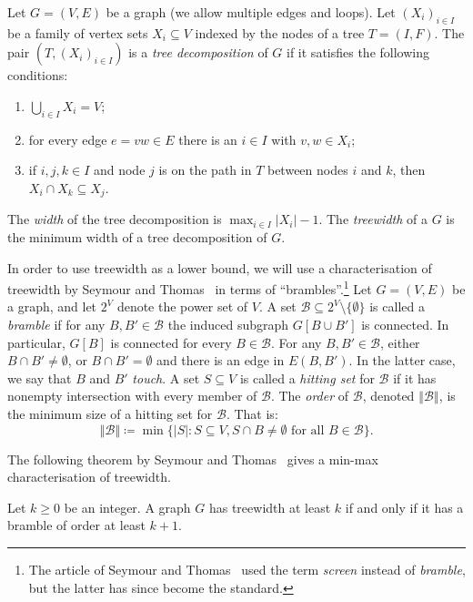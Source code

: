 \documentclass[ALCO,ThmDefs,Unicode,epreuves]{cedram}
\newcommand*{\B}{\mathcal{B}}
\newcommand*{\order}[1]{\left\Vert#1\right\Vert}
\begin{document}
Let $G=(V,E)$ be a graph (we allow multiple edges and loops). Let $(X_i)_{i\in I}$ be a family of vertex sets $X_i\subseteq V$ indexed by the nodes of a tree $T=(I,F)$. The pair $(T,(X_i)_{i\in I})$ is a \emph{tree decomposition} of $G$ if it satisfies the following conditions: 
\begin{enumerate}[label=(\roman*)]
 \item $\bigcup_{i\in I} X_i = V$;
 \item for every edge $e=vw\in E$ there is an $i\in I$ with $v,w\in X_i$;
 \item if $i,j,k\in I$ and node $j$ is on the path in $T$ between nodes $i$ and $k$, then $X_i\cap X_k\subseteq X_j$.
\end{enumerate}
The \emph{width} of the tree decomposition is $\max_{i\in I} |X_i|-1$. The \emph{treewidth} of a $G$ is the minimum width of a tree decomposition of $G$. 


In order to use treewidth as a lower bound, we will use a characterisation of treewidth by Seymour and Thomas~\cite{SeymourThomas1993} in terms of ``brambles''.\footnote{The article of Seymour and Thomas~\cite{SeymourThomas1993} used the term \emph{screen} instead of \emph{bramble}, but the latter has since become the standard.} Let $G=(V,E)$ be a graph, and let $2^V$ denote the power set of $V$. A set $\B\subseteq 2^V\setminus\{\emptyset\}$ is called a \emph{bramble} if for any $B,B'\in \B$ the induced subgraph $G[B\cup B']$ is connected. In particular, $G[B]$ is connected for every $B\in \B$. For any $B,B'\in \B$, either $B\cap B'\neq \emptyset$, or $B\cap B'=\emptyset$ and there is an edge in $E(B,B')$. In the latter case, we say that $B$ and $B'$ \emph{touch}.
A set $S\subseteq V$ is called a \emph{hitting set} for $\B$ if it has nonempty intersection with every member of $\B$. The \emph{order} of $\B$, denoted $\order{\B}$, is the minimum size of a hitting set for $\B$. That is:
\begin{equation}
\order{\B}\coloneqq \min \{|S| : S\subseteq V, S\cap B\neq\emptyset \text{ for all $B\in \B$}\}.
\end{equation}

The following theorem by Seymour and Thomas~\cite{SeymourThomas1993} gives a min-max characterisation of treewidth.

\begin{theorem}
Let $k\geq 0$ be an integer. A graph $G$ has treewidth at least $k$ if and only if it has a bramble of order at least $k + 1$.
\end{theorem} 
\end{document}
